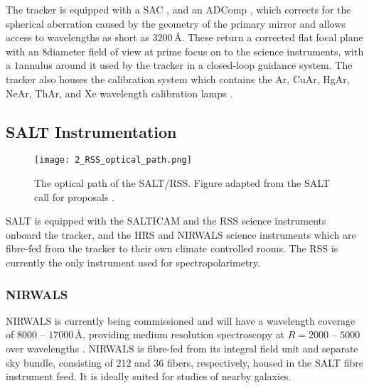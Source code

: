 
The tracker is equipped with a \gls{SAC} \citep{SALT_SAC}, and an \gls{ADComp} \citep{SALT_ADC}, which corrects for the spherical aberration caused by the geometry of the primary mirror and allows access to wavelengths as short as $3200$\,\AA.
These return a corrected flat focal plane with an $8$\arcmin diameter field of view at prime focus on to the science instruments, with a $1$\arcmin annulus around it used by the tracker in a closed-loop guidance system.
The tracker also houses the calibration system which contains the \gls{Ar}, \gls{CuAr}, \gls{HgAr}, \gls{NeAr}, \gls{ThAr}, and \gls{Xe} wavelength calibration lamps \citep{SALT_cal_sys}.

\subsection[SALT Instrumentation]{\gls{SALT} Instrumentation} \label{subsec:SALT_instr}

\begin{figure}[t]
    \centering
    \texttt{[image: 2\_RSS\_optical\_path.png]}
    \caption{
        The optical path of the \gls{SALT}/\gls{RSS}.
        Figure adapted from the \gls{SALT} call for proposals \citep{SALT_CFP}.
    }
    \label{fig:RSS_layout}
\end{figure}

\Gls{SALT} is equipped with the \gls{SALTICAM} and the \gls{RSS} science instruments onboard the tracker, and the \gls{HRS} and \gls{NIRWALS} science instruments which are fibre-fed from the tracker to their own climate controlled rooms.
The \gls{RSS} is currently the only instrument used for spectropolarimetry.

\subsubsection{\gls{NIRWALS}}

\Gls{NIRWALS} is currently being commissioned and will have a wavelength coverage of $8000$ -- $17000$\,\AA, providing medium resolution spectroscopy at $R = 2000$ -- $5000$ over  wavelengths \citep{NIRWALS, SALT_NIRWALS}.
\gls{NIRWALS} is fibre-fed from its integral field unit and separate sky bundle, consisting of $212$ and $36$ fibers, respectively, housed in the \gls{SALT} fibre instrument feed.
It is ideally suited for studies of nearby galaxies.

